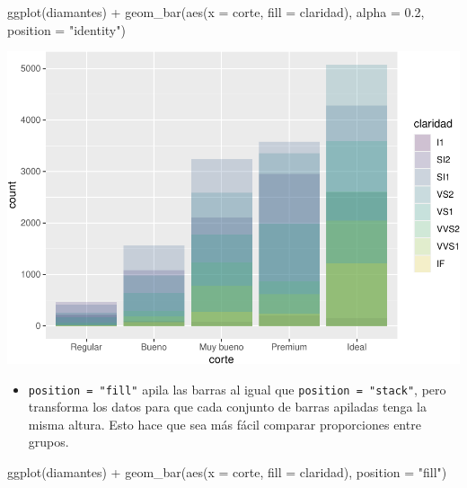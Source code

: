 \documentclass[
  openany]{book}
\newenvironment{Shaded}{\begin{snugshade}}{\end{snugshade}}
\newcommand{\AttributeTok}[1]{\textcolor[rgb]{0.77,0.63,0.00}{#1}}
\newcommand{\FloatTok}[1]{\textcolor[rgb]{0.00,0.00,0.81}{#1}}
\newcommand{\FunctionTok}[1]{\textcolor[rgb]{0.00,0.00,0.00}{#1}}
\newcommand{\NormalTok}[1]{#1}
\newcommand{\SpecialCharTok}[1]{\textcolor[rgb]{0.00,0.00,0.00}{#1}}
\newcommand{\StringTok}[1]{\textcolor[rgb]{0.31,0.60,0.02}{#1}}
\providecommand{\tightlist}{%
  \setlength{\itemsep}{0pt}\setlength{\parskip}{0pt}}
\begin{document}
\begin{Shaded}
\begin{Highlighting}[]
\FunctionTok{ggplot}\NormalTok{(diamantes) }\SpecialCharTok{+}
  \FunctionTok{geom\_bar}\NormalTok{(}\FunctionTok{aes}\NormalTok{(}\AttributeTok{x =}\NormalTok{ corte, }\AttributeTok{fill =}\NormalTok{ claridad), }\AttributeTok{alpha =} \FloatTok{0.2}\NormalTok{, }\AttributeTok{position =} \StringTok{"identity"}\NormalTok{)}
\end{Highlighting}
\end{Shaded}

\begin{center}\includegraphics[width=1\linewidth]{DT6_files/figure-latex/unnamed-chunk-64-1} \end{center}

\begin{itemize}
\tightlist
\item
  \texttt{position\ =\ "fill"} apila las barras al igual que \texttt{position\ =\ "stack"}, pero transforma los datos para que cada conjunto de barras apiladas tenga la misma altura. Esto hace que sea más fácil comparar proporciones entre grupos.
\end{itemize}

\begin{Shaded}
\begin{Highlighting}[]
\FunctionTok{ggplot}\NormalTok{(diamantes) }\SpecialCharTok{+}
  \FunctionTok{geom\_bar}\NormalTok{(}\FunctionTok{aes}\NormalTok{(}\AttributeTok{x =}\NormalTok{ corte, }\AttributeTok{fill =}\NormalTok{ claridad), }\AttributeTok{position =} \StringTok{"fill"}\NormalTok{)}
\end{Highlighting}
\end{Shaded}
\end{document}
